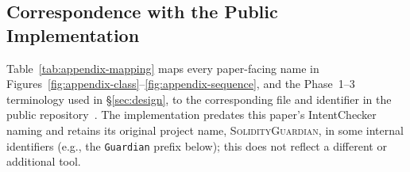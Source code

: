 \documentclass[pdflatex,sn-basic]{sn-jnl}%
\theoremstyle{thmstyleone}%
\theoremstyle{thmstyletwo}%
\theoremstyle{thmstylethree}%
\begin{document}
\subsection{Correspondence with the Public Implementation}
\label{appendix:validation-engine-mapping}

Table~\ref{tab:appendix-mapping} maps every paper-facing name in Figures~\ref{fig:appendix-class}--\ref{fig:appendix-sequence}, and the Phase~1--3 terminology used in \S\ref{sec:design}, to the corresponding file and identifier in the public repository~\citep{intentchecker}. The implementation predates this paper's IntentChecker naming and retains its original project name, \textsc{SolidityGuardian}, in some internal identifiers (e.g., the \texttt{Guardian} prefix below); this does not reflect a different or additional tool.
\end{document}
